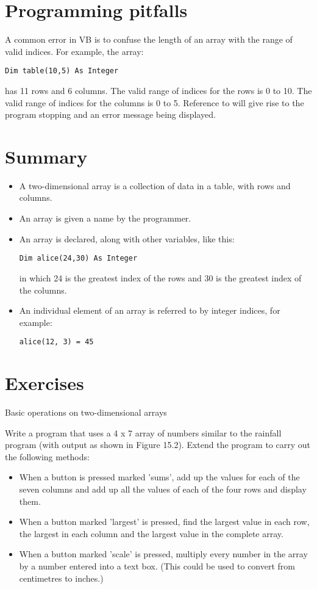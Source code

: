 	\section{Programming pitfalls}
		A common error in VB is to confuse the length of an array with the range of valid indices. For example, the array:
		\begin{lstlisting}
Dim table(10,5) As Integer
		\end{lstlisting}
		has 11 rows and 6 columns. The valid range of indices for the rows is 0 to 10. The valid range of indices for the columns is 0 to 5. Reference to  will give rise to the program stopping and an error message being displayed.


	\section{Summary}
		\begin{itemize}
      \item A two-dimensional array is a collection of data in a table, with rows and columns.
      \item An array is given a name by the programmer.
      \item An array is declared, along with other variables, like this:
				\begin{lstlisting}
Dim alice(24,30) As Integer
				\end{lstlisting}
				in which 24 is the greatest index of the rows and 30 is the greatest index of the columns.
      \item An individual element of an array is referred to by integer indices, for example:
				\begin{lstlisting}
alice(12, 3) = 45
				\end{lstlisting}
		\end{itemize}


	\section{Exercises}
		Basic operations on two-dimensional arrays
		\begin{EXE}
			\item	{} Write a program that uses a 4 x 7 array of numbers similar to the rainfall program (with output as shown in Figure 15.2). Extend the program to carry out the following methods:
				\begin{itemize}
		      \item When a button is pressed marked 'sums', add up the values for each of the seven columns and add up all the values of each of the four rows and display them.
     			\item When a button marked 'largest' is pressed, find the largest value in each row, the largest in each column and the largest value in the complete array.
			    \item When a button marked 'scale' is pressed, multiply every number in the array by a number entered into a text box. (This could be used to convert from centimetres to inches.)
				\end{itemize}
		\end{EXE}
			
